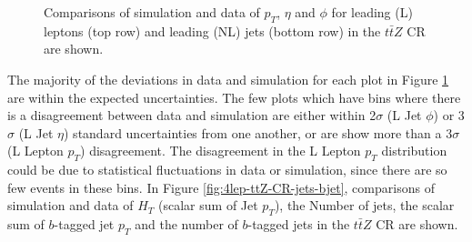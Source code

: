 \begin{figure}[htbp]
\begin{tabular}{ccc}
  \end{tabular}
    \caption{Comparisons of simulation and data of $p_{T}$, $\eta$ and $\phi$ for leading (L) leptons (top row) and leading (NL) jets (bottom row) in the $t\bar{t}Z$ CR are shown.}\label{fig:4lep-ttZ-CR-leptonPlots}
\end{figure}The majority of the deviations in data and simulation for each plot in Figure \ref{fig:4lep-ttZ-CR-leptonPlots} are within the expected uncertainties. The few plots which have bins where there is a disagreement between data and simulation are either within 2$\sigma$ (L Jet $\phi$) or 3$\sigma$ (L Jet $\eta$) standard uncertainties from one another, or are show more than a 3$\sigma$ (L Lepton $p_{T}$) disagreement. The disagreement in the L Lepton $p_{T}$ distribution could be due to statistical fluctuations in data or simulation, since there are so few events in these bins. In Figure \ref{fig:4lep-ttZ-CR-jets-bjet}, comparisons of simulation and data of $H_{T}$ (scalar sum of Jet $p_{T}$), the Number of jets, the scalar sum of $b$-tagged jet $p_{T}$ and the number of $b$-tagged jets in the $t\bar{t}Z$ CR are shown.
